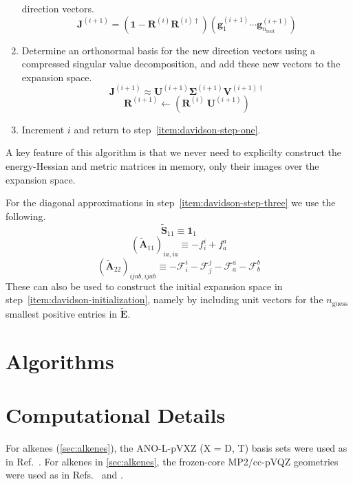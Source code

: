 \begin{enumerate}
        direction vectors.
        \[
            \mathbf{J}^{(i+1)}
            =
            (\mathbf{1} - \mathbf{R}^{(i)}\mathbf{R}^{(i)\dagger})
            (\mathbf{g}_1^{(i+1)}\cdots \mathbf{g}_{n_\mathrm{root}}^{(i+1)})
        \]
    \item
        Determine an orthonormal basis for the new direction vectors using a
        compressed singular value decomposition, and add these new vectors to
        the expansion space.
        \[
            \mathbf{J}^{(i+1)}
            \approx
            \mathbf{U}^{(i+1)}
            \boldsymbol\Sigma^{(i+1)}
            \mathbf{V}^{(i+1)\dagger}
        \]
        \[
            \mathbf{R}^{(i+1)}
            \leftarrow
            (\mathbf{R}^{(i)}\ \mathbf{U}^{(i+1)})
        \]
    \item
        Increment \(i\) and return to step~\ref{item:davidson-step-one}.
\end{enumerate}
A key feature of this algorithm is that we never need to explicilty construct
the energy-Hessian and metric matrices in memory, only their images over the
expansion space.

For the diagonal approximations in step~\ref{item:davidson-step-three} we use
the following.
\[
    \tilde{\mathbf{S}}_{11}
    \equiv
    \mathbf{1}_1
\]
\[
    (\tilde{\mathbf{A}}_{11})_{ia,ia}
    \equiv
    -
    f_i^i
    +
    f_a^a
\]
\[
    (\tilde{\mathbf{A}}_{22})_{ijab,ijab}
    \equiv
    -
    \mathcal{F}_i^i
    -
    \mathcal{F}_j^j
    -
    \mathcal{F}_a^a
    -
    \mathcal{F}_b^b
\]
These can also be used to construct the initial expansion space in
step~\ref{item:davidson-initialization}, namely by including unit vectors for
the \(n_\mathrm{guess}\) smallest positive entries in \(\tilde{\mathbf{E}}\).


\section{Algorithms}


\section{Computational Details}

For alkenes (\cref{sec:alkenes}), the ANO-L-pVXZ (X = D, T) basis
sets\cite{Widmark:1990p291} were used as in Ref.~.
For alkenes in \cref{sec:alkenes}, the frozen-core MP2/cc-pVQZ geometries were
used as in Refs.~ and .



